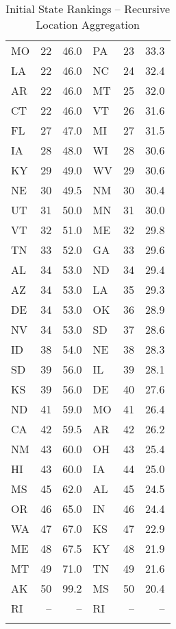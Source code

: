 \begin{longtable}{lrr||lrr}
        MO &   22 &  46.0 &             PA &   23 &  33.3 \\
        LA &   22 &  46.0 &             NC &   24 &  32.4 \\
        AR &   22 &  46.0 &             MT &   25 &  32.0 \\
        CT &   22 &  46.0 &             VT &   26 &  31.6 \\
        FL &   27 &  47.0 &             MI &   27 &  31.5 \\
        IA &   28 &  48.0 &             WI &   28 &  30.6 \\
        KY &   29 &  49.0 &             WV &   29 &  30.6 \\
        NE &   30 &  49.5 &             NM &   30 &  30.4 \\
        UT &   31 &  50.0 &             MN &   31 &  30.0 \\
        VT &   32 &  51.0 &             ME &   32 &  29.8 \\
        TN &   33 &  52.0 &             GA &   33 &  29.6 \\
        AL &   34 &  53.0 &             ND &   34 &  29.4 \\
        AZ &   34 &  53.0 &             LA &   35 &  29.3 \\
        DE &   34 &  53.0 &             OK &   36 &  28.9 \\
        NV &   34 &  53.0 &             SD &   37 &  28.6 \\
        ID &   38 &  54.0 &             NE &   38 &  28.3 \\
        SD &   39 &  56.0 &             IL &   39 &  28.1 \\
        KS &   39 &  56.0 &             DE &   40 &  27.6 \\
        ND &   41 &  59.0 &             MO &   41 &  26.4 \\
        CA &   42 &  59.5 &             AR &   42 &  26.2 \\
        NM &   43 &  60.0 &             OH &   43 &  25.4 \\
        HI &   43 &  60.0 &             IA &   44 &  25.0 \\
        MS &   45 &  62.0 &             AL &   45 &  24.5 \\
        OR &   46 &  65.0 &             IN &   46 &  24.4 \\
        WA &   47 &  67.0 &             KS &   47 &  22.9 \\
        ME &   48 &  67.5 &             KY &   48 &  21.9 \\
        MT &   49 &  71.0 &             TN &   49 &  21.6 \\
        AK &   50 &  99.2 &             MS &   50 &  20.4 \\
        RI &   -- &    -- &             RI &   -- &    -- \\
        \caption{Initial State Rankings -- Recursive Location Aggregation}
        \label{tab:dns_only_recursive_initial_state_rankings}
\end{longtable}
